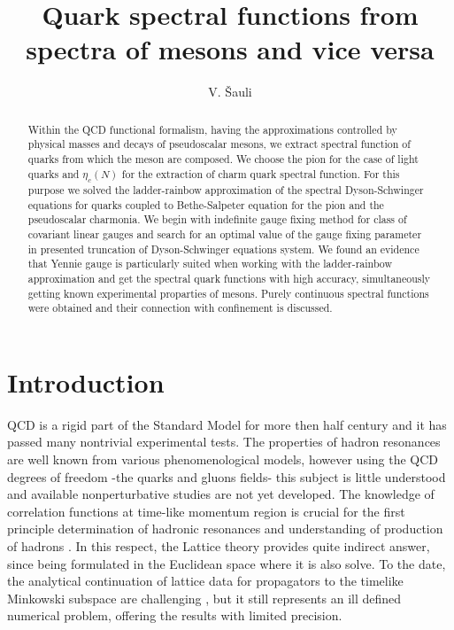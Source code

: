 \documentclass[aps,prd,superscriptaddress,eqsecnum,amsfonts,showpacs,epsfig]{revtex4}
\begin{document}

\title{Quark spectral functions from spectra of mesons and vice versa}

\author{V. \v{S}auli}  


%   

\begin{abstract}
Within the QCD functional formalism, having the approximations  controlled by physical masses and decays  of pseudoscalar mesons,
we extract spectral  function of quarks from which the  meson are composed.
 We choose the pion for the case of light quarks and $\eta_c(N)$ for the extraction of charm quark spectral function. For this purpose we solved the  ladder-rainbow approximation of the  spectral Dyson-Schwinger equations for quarks coupled to Bethe-Salpeter equation for the pion and  the pseudoscalar charmonia. We   begin with indefinite  gauge fixing method for class of covariant linear gauges  and search for an optimal value of the gauge fixing parameter in presented  truncation of Dyson-Schwinger equations system. We found an evidence that Yennie gauge is particularly suited when working with the ladder-rainbow approximation and get the spectral quark functions with high accuracy, simultaneously getting known experimental proparties of mesons. Purely continuous spectral functions were obtained  and their connection with confinement is  discussed.
\end{abstract}

\maketitle





\section{Introduction}

QCD is  a rigid part of the Standard Model  for more then half century and it has passed many nontrivial experimental tests.
The properties of  hadron resonances are well known from various phenomenological models, however using the QCD degrees of freedom
 -the quarks and gluons fields- this subject is little understood  and  available nonperturbative studies 
are not yet  developed. The knowledge of correlation functions  at time-like momentum region is crucial for the first principle
determination of hadronic resonances and understanding of production of hadrons \cite{s3,s4}. In this respect, the Lattice theory provides quite indirect answer, since being formulated in the Euclidean space where it is also solve. To the date, the  analytical continuation of lattice data for propagators to the timelike Minkowski subspace are challenging \cite{DORS2020,LD2022} , but it still represents an ill defined  numerical problem, offering the results with limited precision. 
\end{document}
